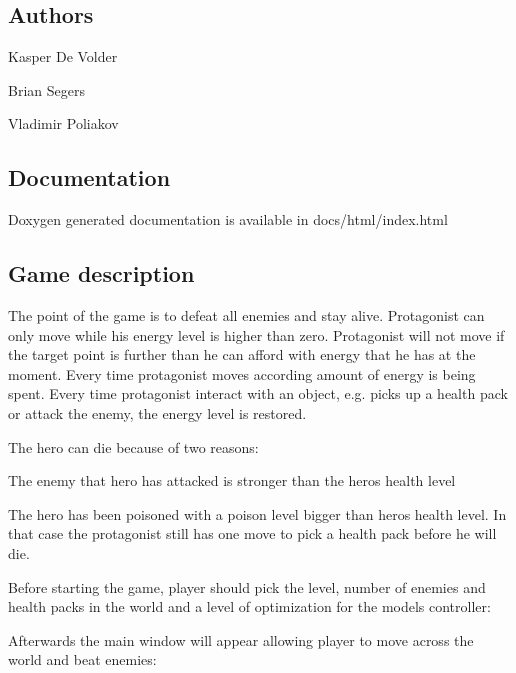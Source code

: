 \subsection*{Authors}


\begin{DoxyItemize}
\item Kasper De Volder
\item Brian Segers
\item Vladimir Poliakov
\end{DoxyItemize}

\subsection*{Documentation}

Doxygen generated documentation is available in docs/html/index.\+html

\subsection*{Game description}

The point of the game is to defeat all enemies and stay alive. Protagonist can only move while his energy level is higher than zero. Protagonist will not move if the target point is further than he can afford with energy that he has at the moment. Every time protagonist moves according amount of energy is being spent. Every time protagonist interact with an object, e.\+g. picks up a health pack or attack the enemy, the energy level is restored.

The hero can die because of two reasons\+:
\begin{DoxyItemize}
\item The enemy that hero has attacked is stronger than the hero\textquotesingle{}s health level
\item The hero has been poisoned with a poison level bigger than hero\textquotesingle{}s health level. In that case the protagonist still has one move to pick a health pack before he will die.
\end{DoxyItemize}

Before starting the game, player should pick the level, number of enemies and health packs in the world and a level of optimization for the model\textquotesingle{}s controller\+:



Afterwards the main window will appear allowing player to move across the world and beat enemies\+:



